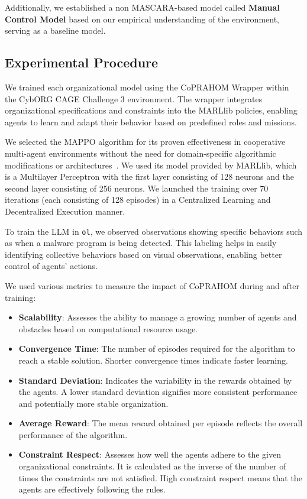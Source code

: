 \documentclass[conference]{IEEEtran}
\begin{document}
Additionally, we established a non MASCARA-based model called \textbf{Manual Control Model} based on our empirical understanding of the environment, serving as a baseline model.

\subsection{Experimental Procedure}

We trained each organizational model using the CoPRAHOM Wrapper within the CybORG CAGE Challenge 3 environment. The wrapper integrates organizational specifications and constraints into the MARLlib policies, enabling agents to learn and adapt their behavior based on predefined roles and missions.

We selected the MAPPO algorithm for its proven effectiveness in cooperative multi-agent environments without the need for domain-specific algorithmic modifications or architectures~\cite{Yu2022}. We used its model provided by MARLlib, which is a Multilayer Perceptron with the first layer consisting of 128 neurons and the second layer consisting of 256 neurons. We launched the training over 70 iterations (each consisting of 128 episodes) in a Centralized Learning and Decentralized Execution manner.

To train the LLM in \texttt{ol}, we observed observations showing specific behaviors such as when a malware program is being detected. This labeling helps in easily identifying collective behaviors based on visual observations, enabling better control of agents' actions.

We used various metrics to measure the impact of CoPRAHOM during and after training:
\begin{itemize}
    \item \textbf{Scalability}: Assesses the ability to manage a growing number of agents and obstacles based on computational resource usage.
    \item \textbf{Convergence Time}: The number of episodes required for the algorithm to reach a stable solution. Shorter convergence times indicate faster learning.
    \item \textbf{Standard Deviation}: Indicates the variability in the rewards obtained by the agents. A lower standard deviation signifies more consistent performance and potentially more stable organization.
    \item \textbf{Average Reward}: The mean reward obtained per episode reflects the overall performance of the algorithm.
    \item \textbf{Constraint Respect}: Assesses how well the agents adhere to the given organizational constraints. It is calculated as the inverse of the number of times the constraints are not satisfied. High constraint respect means that the agents are effectively following the rules.
\end{itemize}
\end{document}
